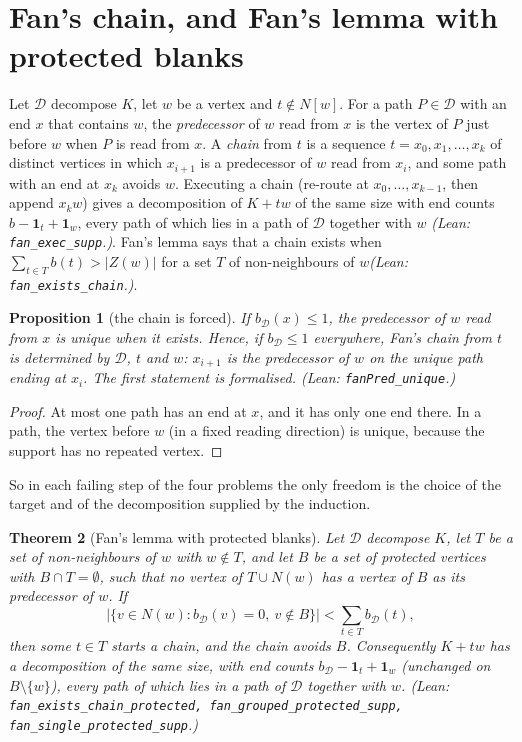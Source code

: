 \documentclass[11pt]{amsart}
\newtheorem{theorem}{Theorem}[section]
\newtheorem{proposition}[theorem]{Proposition}
\theoremstyle{definition}
\newcommand{\cD}{\mathcal D}
\newcommand{\lean}[1]{\quad\emph{(Lean: \texttt{#1}.)}}
\begin{document}
\section{Fan's chain, and Fan's lemma with protected blanks}\label{sec:fan}

Let $\cD$ decompose $K$, let $w$ be a vertex and $t\notin N[w]$. For a path $P\in\cD$ with an end
$x$ that contains $w$, the \emph{predecessor} of $w$ read from $x$ is the vertex of $P$ just before
$w$ when $P$ is read from $x$. A \emph{chain} from $t$ is a sequence $t=x_0,x_1,\dots,x_k$ of
distinct vertices in which $x_{i+1}$ is a predecessor of $w$ read from $x_i$, and some path with an
end at $x_k$ avoids $w$. Executing a chain (re-route at $x_0,\dots,x_{k-1}$, then append $x_kw$)
gives a decomposition of $K+tw$ of the same size with end counts $b-\mathbf 1_t+\mathbf 1_w$, every
path of which lies in a path of $\cD$ together with $w$ \cite[Lemma~2.2]{RD}\lean{fan\_exec\_supp}.
Fan's lemma says that a chain exists when $\sum_{t\in T}b(t)>|Z(w)|$ for a set $T$ of
non-neighbours of $w$\lean{fan\_exists\_chain}.

\begin{proposition}[the chain is forced]\label{prop:forced}
If $b_\cD(x)\le1$, the predecessor of $w$ read from $x$ is unique when it exists. Hence, if
$b_\cD\le1$ everywhere, Fan's chain from $t$ is determined by $\cD$, $t$ and $w$: $x_{i+1}$ is the
predecessor of $w$ on the unique path ending at $x_i$. The first statement is formalised.
\lean{fanPred\_unique}
\end{proposition}

\begin{proof}
At most one path has an end at $x$, and it has only one end there. In a path, the vertex before $w$
(in a fixed reading direction) is unique, because the support has no repeated vertex.
\end{proof}

So in each failing step of the four problems the only freedom is the choice of the target and of the
decomposition supplied by the induction.

\begin{theorem}[Fan's lemma with protected blanks]\label{thm:protected}
Let $\cD$ decompose $K$, let $T$ be a set of non-neighbours of $w$ with $w\notin T$, and let $B$ be
a set of \emph{protected} vertices with $B\cap T=\emptyset$, such that no vertex of $T\cup N(w)$ has
a vertex of $B$ as its predecessor of $w$. If
\[\bigl|\{v\in N(w): b_\cD(v)=0,\ v\notin B\}\bigr|<\sum_{t\in T}b_\cD(t),\]
then some $t\in T$ starts a chain, and the chain avoids $B$. Consequently $K+tw$ has a
decomposition of the same size, with end counts $b_\cD-\mathbf 1_t+\mathbf 1_w$ (unchanged on
$B\setminus\{w\}$), every path of which lies in a path of $\cD$ together with $w$.
\lean{fan\_exists\_chain\_protected, fan\_grouped\_protected\_supp, fan\_single\_protected\_supp}
\end{theorem}
\end{document}
